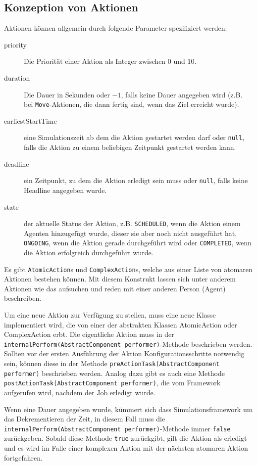 \subsection{Konzeption von Aktionen}\label{subsec:concept_actions}
Aktionen können allgemein durch folgende Parameter spezifiziert werden:
\begin{description}
	\item[priority] Die Priorität einer Aktion als Integer zwischen $0$ und $10$.
	\item[duration] Die Dauer in Sekunden oder $-1$, falls keine Dauer angegeben wird (z.B. bei \texttt{Move}-Aktionen, die dann fertig sind, wenn das Ziel erreicht wurde).
	\item[earliestStartTime] eine Simulationszeit ab dem die Aktion gestartet werden darf oder \texttt{null}, falls die Aktion zu einem beliebigen Zeitpunkt gestartet werden kann.
	\item[deadline] ein Zeitpunkt, zu dem die Aktion erledigt sein muss oder \texttt{null}, falls keine Headline angegeben wurde.
	\item[state] der aktuelle Status der Aktion, z.B. \texttt{SCHEDULED}, wenn die Aktion einem Agenten hinzugefügt wurde, dieser sie aber noch nicht ausgeführt hat, \texttt{ONGOING}, wenn die Aktion gerade durchgeführt wird oder \texttt{COMPLETED}, wenn die Aktion erfolgreich durchgeführt wurde.
\end{description}
Es gibt \texttt{AtomicAction}s und \texttt{ComplexAction}s, welche aus einer Liste von atomaren Aktionen bestehen können. Mit diesem Konstrukt lassen sich unter anderem Aktionen wie das aufsuchen und reden mit einer anderen Person (Agent) beschreiben.

Um eine neue Aktion zur Verfügung zu stellen, muss eine neue Klasse implementiert wird, die von einer der abstrakten Klassen AtomicAction oder ComplexAction erbt. Die eigentliche Aktion muss in der \texttt{internalPerform(AbstractComponent performer)}-Methode beschrieben werden. Sollten vor der ersten Ausführung der Aktion Konfigurationsschritte notwendig sein, können diese in der Methode \texttt{preActionTask(AbstractComponent performer)} beschrieben werden. Analog dazu gibt es auch eine Methode \texttt{postActionTask(AbstractComponent performer)}, die vom Framework aufgerufen wird, nachdem der Job erledigt wurde.

Wenn eine Dauer angegeben wurde, kümmert sich dass Simulationsframework um das Dekrementieren der Zeit, in diesem Fall muss die \texttt{internalPerform(AbstractComponent performer)}-Methode immer \texttt{false} zurückgeben. Sobald diese Methode \texttt{true} zurückgibt, gilt die Aktion als erledigt und es wird im Falle einer komplexen Aktion mit der nächsten atomaren Aktion fortgefahren.

